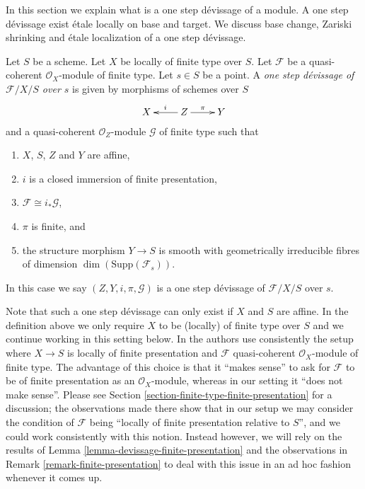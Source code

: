 \noindent
In this section we explain what is a one step d\'evissage of a
module. A one step d\'evissage exist \'etale locally on base and target.
We discuss base change, Zariski shrinking and \'etale localization of
a one step d\'evissage.

\begin{definition}
\label{definition-one-step-devissage}
Let $S$ be a scheme.
Let $X$ be locally of finite type over $S$.
Let $\mathcal{F}$ be a quasi-coherent $\mathcal{O}_X$-module of finite type.
Let $s \in S$ be a point.
A {\it one step d\'evissage of $\mathcal{F}/X/S$ over $s$}
is given by morphisms of schemes over $S$
$$
\xymatrix{
X & Z \ar[l]_i \ar[r]^\pi & Y
}
$$
and a quasi-coherent $\mathcal{O}_Z$-module $\mathcal{G}$ of finite type
such that
\begin{enumerate}
\item $X$, $S$, $Z$ and $Y$ are affine,
\item $i$ is a closed immersion of finite presentation,
\item $\mathcal{F} \cong i_*\mathcal{G}$,
\item $\pi$ is finite, and
\item the structure morphism $Y \to S$ is smooth with
geometrically irreducible fibres of
dimension $\dim(\text{Supp}(\mathcal{F}_s))$.
\end{enumerate}
In this case we say $(Z, Y, i, \pi, \mathcal{G})$ is a one step
d\'evissage of $\mathcal{F}/X/S$ over $s$.
\end{definition}

\noindent
Note that such a one step d\'evissage can only exist if $X$ and $S$
are affine. In the definition above we only require $X$ to be
(locally) of finite type over $S$ and we continue working in this
setting below. In \cite{GruRay} the authors use consistently the setup
where $X \to S$ is locally of finite presentation and $\mathcal{F}$
quasi-coherent $\mathcal{O}_X$-module of finite type. The advantage
of this choice is that it ``makes sense'' to ask for $\mathcal{F}$ to
be of finite presentation as an $\mathcal{O}_X$-module, whereas in our
setting it ``does not make sense''. Please see
Section \ref{section-finite-type-finite-presentation}
for a discussion; the observations made there show that in our setup
we may consider the condition of $\mathcal{F}$ being ``locally of finite
presentation relative to $S$'', and we could work consistently with this
notion. Instead however, we will rely on the results of
Lemma \ref{lemma-devissage-finite-presentation}
and the observations in
Remark \ref{remark-finite-presentation}
to deal with this issue in an ad hoc fashion whenever it comes up.

